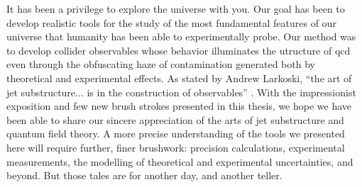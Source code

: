 It has been a privilege to explore the universe with you.
%
Our goal has been to develop realistic tools for the study of the most fundamental features of our universe that humanity has been able to experimentally probe.
%
Our method was to develop collider observables whose behavior illuminates the utructure of \gls{qcd} even through the obfuscating haze of contamination generated both by theoretical and experimental effects.
%
As stated by Andrew Larkoski, ``the art of jet substructure... is in the construction of observables'' \cite{Larkoski:2024uoc}.
%
With the impressionist exposition and few new brush strokes presented in this thesis, we hope we have been able to share our sincere appreciation of the arts of jet substructure and quantum field theory.
%
A more precise understanding of the tools we presented here will require further, finer brushwork:
%
precision calculations, experimental measurements, the modelling of theoretical and experimental uncertainties, and beyond.
%
But those tales are for another day, and another teller.
